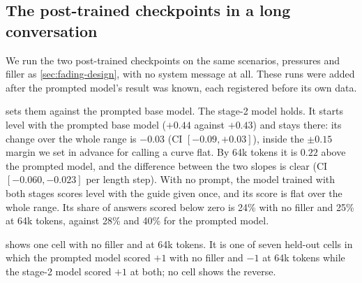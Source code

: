 \documentclass[11pt]{article}
\begin{document}
\subsection{The post-trained checkpoints in a long conversation}\label{sec:res-fading}

We run the two post-trained checkpoints on the same scenarios, pressures and
filler as \cref{sec:fading-design}, with no system message at all.
These runs were added after the prompted model's result was known,
each registered before its own data.


 sets them against the prompted base model. The
stage-2 model holds. It starts level with the prompted base
model ($+0.44$ against $+0.43$) and stays there: its change over the
whole range is $-0.03$ (CI $[-0.09, +0.03]$), inside the $\pm 0.15$
margin we set in advance for calling a curve flat. By 64k tokens it
is $0.22$ above the prompted model, and the difference between the two
slopes is clear (CI $[-0.060, -0.023]$ per length step). With no
prompt, the model trained with both stages scores level with the guide
given once, and its score is flat over the whole range. Its share of
answers scored below zero is 24\% with no filler and 25\% at 64k
tokens, against 28\% and 40\% for the prompted model.

 shows one cell with no filler and at 64k tokens. It is
one of seven
held-out cells in which the prompted model scored $+1$ with no filler
and $-1$ at 64k tokens while the stage-2 model scored $+1$ at both; no
cell shows the reverse.
\end{document}
